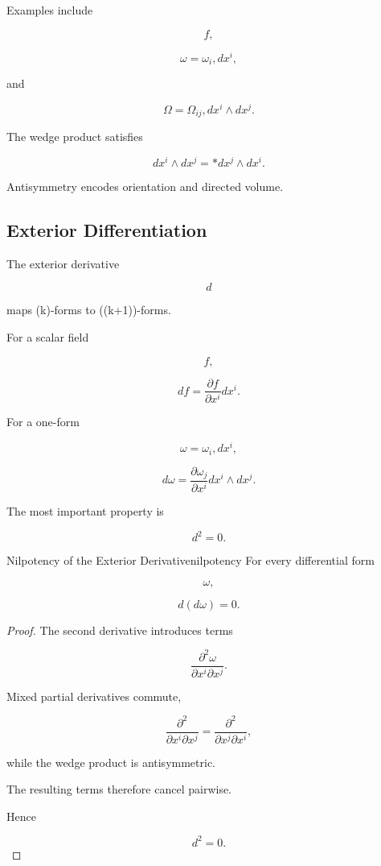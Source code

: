 \documentclass[12pt,twoside,openright]{book}
\begin{document}
Examples include

\[
f,
\]

\[
\omega
=

\omega_i,dx^i,
\]

and

\[
\Omega
=

\Omega_{ij},
dx^i\wedge dx^j.
\]

The wedge product satisfies

\[
dx^i\wedge dx^j
=

*

dx^j\wedge dx^i.
\]

Antisymmetry encodes orientation and directed volume.

\subsection{Exterior Differentiation}

The exterior derivative

\[
d
\]

maps (k)-forms to ((k+1))-forms.

For a scalar field

\[
f,
\]

\[
df
=

\frac{\partial f}{\partial x^i}
dx^i.
\]

For a one-form

\[
\omega
=

\omega_i,dx^i,
\]

\[
d\omega
=

\frac{\partial\omega_j}
{\partial x^i}
dx^i\wedge dx^j.
\]

The most important property is

\[
d^2=0.
\]

\begin{theorem}{Nilpotency of the Exterior Derivative}{nilpotency}
For every differential form

\[
\omega,
\]

\[
d(d\omega)=0.
\]
\end{theorem}

\begin{proof}
The second derivative introduces terms

\[
\frac{\partial^2\omega}
{\partial x^i\partial x^j}.
\]

Mixed partial derivatives commute,

\[
\frac{\partial^2}
{\partial x^i\partial x^j}
=

\frac{\partial^2}
{\partial x^j\partial x^i},
\]

while the wedge product is antisymmetric.

The resulting terms therefore cancel pairwise.

Hence

\[
d^2=0.
\]
\end{proof}
\end{document}
